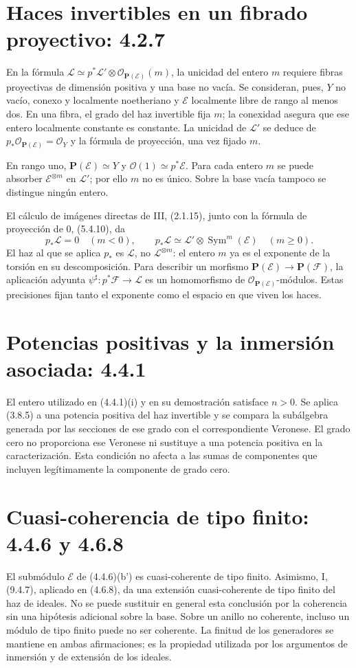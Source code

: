 \documentclass[11pt,a4paper]{article}
\begin{document}
\section{Haces invertibles en un fibrado proyectivo: 4.2.7}
En la fórmula
$\mathcal L\simeq p^*\mathcal L'\otimes\mathcal O_{\mathbf P(\mathcal E)}(m)$,
la unicidad del entero $m$ requiere fibras proyectivas de dimensión
positiva y una base no vacía. Se consideran, pues, $Y$ no vacío,
conexo y localmente noetheriano y $\mathcal E$ localmente libre de
rango al menos dos. En una fibra, el grado del haz invertible fija
$m$; la conexidad asegura que ese entero localmente constante es
constante. La unicidad de $\mathcal L'$ se deduce de
$p_*\mathcal O_{\mathbf P(\mathcal E)}=\mathcal O_Y$ y la fórmula
de proyección, una vez fijado $m$.

En rango uno, $\mathbf P(\mathcal E)\simeq Y$ y
$\mathcal O(1)\simeq p^*\mathcal E$. Para cada entero $m$ se puede
absorber $\mathcal E^{\otimes m}$ en $\mathcal L'$; por ello $m$
no es único. Sobre la base vacía tampoco se distingue ningún entero.

El cálculo de imágenes directas de III, (2.1.15), junto con la
fórmula de proyección de 0, (5.4.10), da
\[
p_*\mathcal L=0\quad(m<0),\qquad
p_*\mathcal L\simeq\mathcal L'\otimes
                \operatorname{Sym}^m(\mathcal E)\quad(m\geq0).
\]
El haz al que se aplica $p_*$ es $\mathcal L$, no
$\mathcal L^{\otimes m}$: el entero $m$ ya es el exponente de
la torsión en su descomposición. Para describir un morfismo
$\mathbf P(\mathcal E)\to\mathbf P(\mathcal F)$, la aplicación
adyunta $\psi^\sharp:p^*\mathcal F\to\mathcal L$ es un
homomorfismo de $\mathcal O_{\mathbf P(\mathcal E)}$-módulos.
Estas precisiones fijan tanto el exponente como el espacio en que
viven los haces.

\section{Potencias positivas y la inmersión asociada: 4.4.1}
El entero utilizado en (4.4.1)(i) y en su demostración satisface
$n>0$. Se aplica (3.8.5) a una potencia positiva del haz invertible
y se compara la subálgebra generada por las secciones de ese grado
con el correspondiente Veronese. El grado cero no proporciona ese
Veronese ni sustituye a una potencia positiva en la caracterización.
Esta condición no afecta a las sumas de componentes que incluyen
legítimamente la componente de grado cero.

\section{Cuasi-coherencia de tipo finito: 4.4.6 y 4.6.8}
El submódulo $\mathcal E$ de (4.4.6)(b') es cuasi-coherente de
tipo finito. Asimismo, I, (9.4.7), aplicado en (4.6.8), da una
extensión cuasi-coherente de tipo finito del haz de ideales.
No se puede sustituir en general esta conclusión por la coherencia
sin una hipótesis adicional sobre la base. Sobre un anillo no
coherente, incluso un módulo de tipo finito puede no ser coherente.
La finitud de los generadores se mantiene en ambas afirmaciones;
es la propiedad utilizada por los argumentos de inmersión y de
extensión de los ideales.
\end{document}
